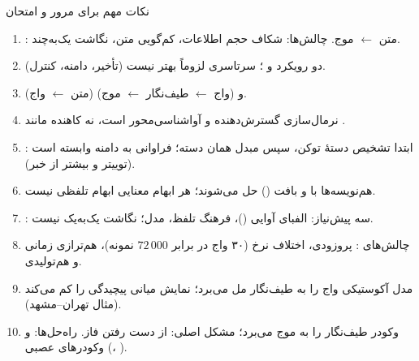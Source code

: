 \begin{exambox}{نکات مهم برای مرور و امتحان}
\begin{enumerate}
  \item {}: متن $\leftarrow$ موج. چالش‌ها: شکاف حجم اطلاعات، کم‌گویی متن، نگاشت یک‌به‌چند.
  \item دو رویکرد  و ؛ سرتاسری لزوماً بهتر نیست (تأخیر، دامنه، کنترل).
  \item {} (متن $\leftarrow$ واج) و  (واج $\leftarrow$ طیف‌نگار $\leftarrow$ موج).
  \item نرمال‌سازی  گسترش‌دهنده و آواشناسی‌محور است، نه کاهنده مانند .
  \item {}: ابتدا تشخیص دستهٔ توکن، سپس مبدل همان دسته؛ فراوانی  به دامنه وابسته است (توییتر و  بیشتر از خبر).
  \item هم‌نویسه‌ها با  و بافت () حل می‌شوند؛ هر ابهام معنایی ابهام تلفظی نیست.
  \item {}: سه پیش‌نیاز: الفبای آوایی ()، فرهنگ تلفظ، مدل؛ نگاشت یک‌به‌یک نیست.
  \item چالش‌های : پروزودی، اختلاف نرخ (۳۰ واج در برابر $72\,000$ نمونه)، هم‌ترازی زمانی و هم‌تولیدی.
  \item مدل آکوستیکی واج را به طیف‌نگار مل می‌برد؛ نمایش میانی پیچیدگی را کم می‌کند (مثال تهران–مشهد).
  \item وکودر طیف‌نگار را به موج می‌برد؛ مشکل اصلی: از دست رفتن فاز. راه‌حل‌ها:  و وکودرهای عصبی (، ).
\end{enumerate}
\end{exambox}
